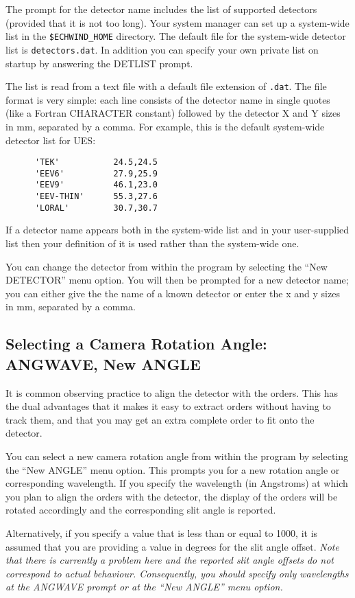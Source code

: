\documentclass[11pt]{article}
\begin{document}
The prompt for the detector name includes the list of supported detectors
(provided that it is not too long). Your system manager can set up a
system-wide list in the {\tt \$ECHWIND\_HOME} directory.
The default file for the system-wide detector list is {\tt detectors.dat}.
In addition you can specify your own private list on
startup by answering the DETLIST prompt. 

The list is read from a text file with a default file extension of {\tt .dat}.
The file format is very simple: each line
consists of the detector name in single quotes (like a Fortran CHARACTER
constant) followed by the detector X and Y sizes in mm, separated by a
comma. For example, this is the default system-wide detector list for UES:
\begin{verbatim}
      'TEK'           24.5,24.5
      'EEV6'          27.9,25.9
      'EEV9'          46.1,23.0
      'EEV-THIN'      55.3,27.6
      'LORAL'         30.7,30.7
\end{verbatim}
If a detector name appears both in the system-wide list and in your
user-supplied list then your definition of it is used rather than the
system-wide one.

You can change the detector from within the program by selecting the ``New
DETECTOR'' menu option. You will then be prompted for a new detector name;
you can either give the the name of a known detector or enter the x and y
sizes in mm, separated by a comma.

\subsection{Selecting a Camera Rotation Angle: ANGWAVE, New ANGLE}

It is common observing practice  to align the detector with the orders.
This has the dual advantages that it makes it easy to extract orders
without having to track them, and that you may get an extra complete order
to fit onto the detector. 

You can select a new camera rotation angle from within the program by selecting
the ``New ANGLE'' menu option. This prompts you for a new rotation
angle or corresponding wavelength. If you specify the wavelength (in
Angstroms) at which you plan to align the orders with the detector, the
display of the orders will be rotated accordingly and the corresponding
slit angle is reported.

Alternatively, if you specify a value that is less than or equal to 1000,
it is assumed that you are providing a value in degrees for the slit angle
offset. {\em Note that there is currently a problem here and the reported
slit angle offsets do not correspond to actual behaviour. Consequently, you
should specify only wavelengths at the ANGWAVE prompt or at the ``New
ANGLE'' menu option.}
\end{document}
